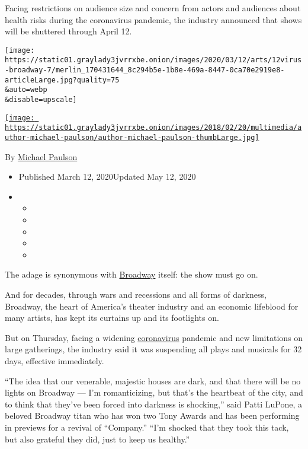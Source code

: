 Facing restrictions on audience size and concern from actors and
audiences about health risks during the coronavirus pandemic, the
industry announced that shows will be shuttered through April 12.

\texttt{[image: https://static01.graylady3jvrrxbe.onion/images/2020/03/12/arts/12virus-broadway-7/merlin\_170431644\_8c294b5e-1b8e-469a-8447-0ca70e2919e8-articleLarge.jpg?quality=75\\\&auto=webp\\\&disable=upscale]}

\href{https://www.nytimes3xbfgragh.onion/by/michael-paulson}{\texttt{[image: https://static01.graylady3jvrrxbe.onion/images/2018/02/20/multimedia/author-michael-paulson/author-michael-paulson-thumbLarge.jpg]}}

By \href{https://www.nytimes3xbfgragh.onion/by/michael-paulson}{Michael
Paulson}

\begin{itemize}
\item
  Published March 12, 2020Updated May 12, 2020
\item
  \begin{itemize}
  \item
  \item
  \item
  \item
  \item
  \end{itemize}
\end{itemize}

The adage is synonymous with
\href{https://www.nytimes3xbfgragh.onion/2020/05/12/theater/broadway-coronavirus.html}{Broadway}
itself: the show must go on.

And for decades, through wars and recessions and all forms of darkness,
Broadway, the heart of America's theater industry and an economic
lifeblood for many artists, has kept its curtains up and its footlights
on.

But on Thursday, facing a widening
\href{https://www.nytimes3xbfgragh.onion/2020/05/12/theater/broadway-coronavirus.html}{coronavirus}
pandemic and new limitations on large gatherings, the industry said it
was suspending all plays and musicals for 32 days, effective
immediately.

``The idea that our venerable, majestic houses are dark, and that there
will be no lights on Broadway --- I'm romanticizing, but that's the
heartbeat of the city, and to think that they've been forced into
darkness is shocking,'' said Patti LuPone, a beloved Broadway titan who
has won two Tony Awards and has been performing in previews for a
revival of ``Company.'' ``I'm shocked that they took this tack, but also
grateful they did, just to keep us healthy.''


